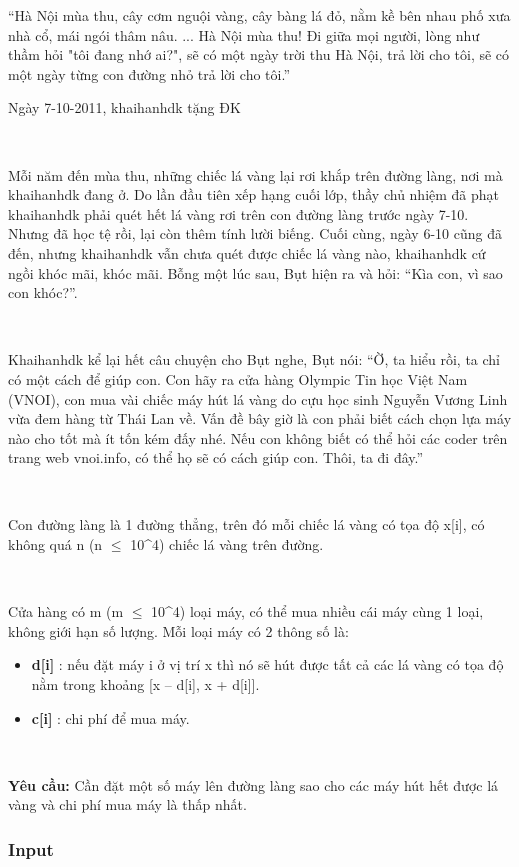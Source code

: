 

“Hà Nội mùa thu, cây cơm nguội vàng, cây bàng lá đỏ, nằm kề bên nhau phố xưa nhà cổ, mái ngói thâm nâu. ... Hà Nội mùa thu! Đi giữa mọi người, lòng như thầm hỏi "tôi đang nhớ ai?", sẽ có một ngày trời thu Hà Nội, trả lời cho tôi, sẽ có một ngày từng con đường nhỏ trả lời cho tôi.”

Ngày 7-10-2011, khaihanhdk tặng ĐK

 

Mỗi năm đến mùa thu, những chiếc lá vàng lại rơi khắp trên đường làng, nơi mà khaihanhdk đang ở. Do lần đầu tiên xếp hạng cuối lớp, thầy chủ nhiệm đã phạt khaihanhdk phải quét hết lá vàng rơi trên con đường làng trước ngày 7-10. Nhưng đã học tệ rồi, lại còn thêm tính lười biếng. Cuối cùng, ngày 6-10 cũng đã đến, nhưng khaihanhdk vẫn chưa quét được chiếc lá vàng nào, khaihanhdk cứ ngồi khóc mãi, khóc mãi. Bỗng một lúc sau, Bụt hiện ra và hỏi: “Kìa con, vì sao con khóc?”.

 

Khaihanhdk kể lại hết câu chuyện cho Bụt nghe, Bụt nói: “Ờ, ta hiểu rồi, ta chỉ có một cách để giúp con. Con hãy ra cửa hàng Olympic Tin học Việt Nam (VNOI), con mua vài chiếc máy hút lá vàng do cựu học sinh Nguyễn Vương Linh vừa đem hàng từ Thái Lan về. Vấn đề bây giờ là con phải biết cách chọn lựa máy nào cho tốt mà ít tốn kém đấy nhé. Nếu con không biết có thể hỏi các coder trên trang web vnoi.info, có thể họ sẽ có cách giúp con. Thôi, ta đi đây.”

 

Con đường làng là 1 đường thẳng, trên đó mỗi chiếc lá vàng có tọa độ x[i], có không quá n (n  $\le$  10\textasciicircum4) chiếc lá vàng trên đường.

 

Cửa hàng có m (m  $\le$  10\textasciicircum4) loại máy, có thể mua nhiều cái máy cùng 1 loại, không giới hạn số lượng. Mỗi loại máy có 2 thông số là:
\begin{itemize}
	\item \textbf{d[i] } : nếu đặt máy i ở vị trí x thì nó sẽ hút được tất cả các lá vàng có tọa độ nằm trong khoảng [x – d[i], x + d[i]].
	\item \textbf{c[i] } : chi phí để mua máy.
\end{itemize}

 

\textbf{Yêu cầu: } Cần đặt một số máy lên đường làng sao cho các máy hút hết được lá vàng và chi phí mua máy là thấp nhất.

\subsubsection{Input}

